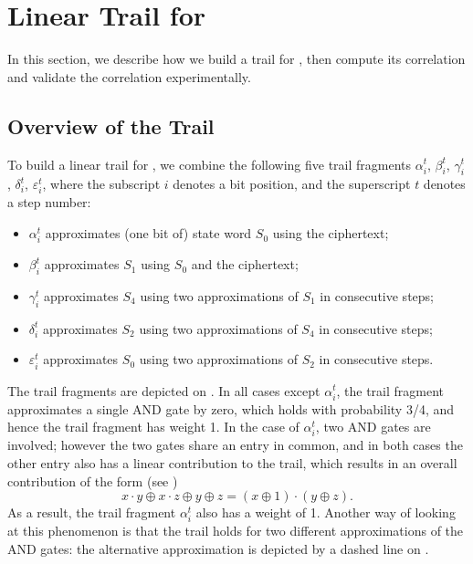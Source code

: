 
\section{Linear Trail for \MiniMORUS}
\label{sec/minitrails}

In this section, we describe how we build a trail for \MiniMORUS, then compute its correlation and validate the correlation experimentally.

\subsection{Overview of the Trail}

To build a linear trail for \MiniMORUS, we combine the following five trail fragments $\alpha^t_i$, $\beta^t_i$, $\gamma^t_i$, $\delta^t_i$, $\varepsilon^t_i$, where the subscript $i$ denotes a bit position, and the superscript $t$ denotes a step number:
\begin{itemize}
    \item $\alpha^t_i$ approximates (one bit of) state word $S_0$ using the ciphertext;
    \item $\beta^t_i$ approximates $S_1$ using $S_0$ and the ciphertext;
    \item $\gamma^t_i$ approximates $S_4$ using two approximations of $S_1$ in consecutive steps;
    \item $\delta^t_i$ approximates $S_2$ using two approximations of $S_4$ in consecutive steps;
    \item $\varepsilon^t_i$ approximates $S_0$ using two approximations of $S_2$ in consecutive steps.
\end{itemize}

The trail fragments are depicted on . In all cases except $\alpha^t_i$, the trail fragment approximates a single AND gate by zero, which holds with probability 3/4, and hence the trail fragment has weight 1. In the case of $\alpha^t_i$, two AND gates are involved; however the two gates share an entry in common, and in both cases the other entry also has a linear contribution to the trail, which results in an overall contribution of the form (see \cite[Sec.~3.3]{DBLP:conf/indocrypt/AshurR16})
\[
x \cdot y \oplus x \cdot z \oplus y \oplus z= (x \oplus 1) \cdot (y \oplus z).
\]
As a result, the trail fragment $\alpha^t_i$ also has a weight of 1. Another way of looking at this phenomenon is that the trail holds for two different approximations of the AND gates: the alternative approximation is depicted by a dashed line on .


